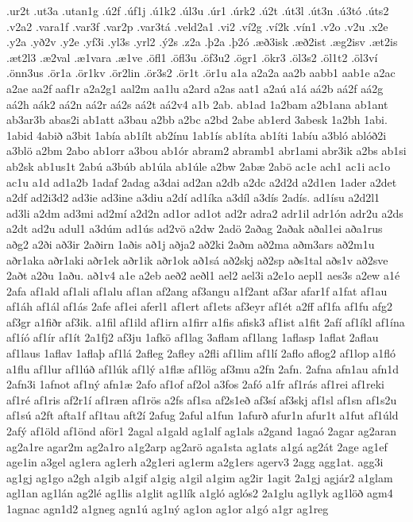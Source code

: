 {.ur2t
.ut3a
.utan1g
.ú2f
.úf1j
.ú1k2
.úl3u
.úr1
.úrk2
.ú2t
.út3l
.út3n
.ú3tó
.úts2
.v2a2
.vara1f
.var3f
.var2p
.var3tá
.veld2a1
.vi2
.ví2g
.ví2k
.vín1
.v2o
.v2u
.x2e
.y2a
.yð2v
.y2e
.yf3i
.yl3s
.yrl2
.ý2s
.z2a
.þ2a
.þ2ó
.æð3isk
.æð2ist
.æg2isv
.æt2is
.æt2l3
.æ2val
.æ1vara
.æ1ve
.öfl1
.öfl3u
.öf3u2
.ögr1
.ökr3
.öl3s2
.öl1t2
.öl3ví
.önn3us
.ör1a
.ör1kv
.ör2lin
.ör3s2
.ör1t
.ör1u
a1a
a2a2a
aa2b
aabb1
aab1e
a2ac
a2ae
aa2f
aaf1r
a2a2g1
aal2m
aa1lu
a2ard
a2as
aat1
a2aú
a1á
aá2b
aá2f
aá2g
aá2h
aák2
aá2n
aá2r
aá2s
aá2t
aá2v4
a1b
2ab.
ab1ad
1a2bam
a2b1ana
ab1ant
ab3ar3b
abas2i
ab1att
a3bau
a2bb
a2bc
a2bd
2abe
ab1erd
3abesk
1a2bh
1abi.
1abid
4abið
a3bit
1abía
ab1ílt
ab2ínu
1ab1ís
ab1íta
ab1íti
1abíu
a3bló
ablóð2i
a3blö
a2bm
2abo
ab1orr
a3bou
ab1ór
abram2
abramb1
abr1ami
abr3ik
a2bs
ab1si
ab2sk
ab1us1t
2abú
a3búb
ab1úla
ab1úle
a2bw
2abæ
2abö
ac1e
ach1
ac1i
ac1o
ac1u
a1d
ad1a2b
1adaf
2adag
a3dai
ad2an
a2db
a2dc
a2d2d
a2d1en
1ader
a2det
a2df
ad2i3d2
ad3ie
ad3ine
a3diu
a2dí
ad1íka
a3díl
a3dís
2adís.
ad1ísu
a2d2l1
ad3li
a2dm
ad3mi
ad2mí
a2d2n
ad1or
ad1ot
ad2r
adra2
adr1il
adr1ón
adr2u
a2ds
a2dt
ad2u
adul1
a3dúm
ad1ús
ad2vö
a2dw
2adö
2aðag
2aðak
aðal1ei
aða1rus
aðg2
a2ði
að3ir
2aðirn
1aðis
að1j
aðja2
að2ki
2aðm
að2ma
aðm3ars
að2m1u
aðr1aka
aðr1aki
aðr1ek
aðr1ik
aðr1ok
að1sá
að2skj
að2sp
aðs1tal
aðs1v
að2sve
2aðt
a2ðu
1aðu.
að1v4
a1e
a2eb
aeð2
aeðl1
ael2
ael3i
a2e1o
aepl1
aes3s
a2ew
a1é
2afa
af1ald
af1ali
af1alu
af1an
af2ang
af3angu
a1f2ant
af3ar
afar1f
a1fat
af1au
af1áh
af1ál
af1ás
2afe
af1ei
aferl1
af1ert
af1ets
af3eyr
af1ét
a2ff
af1fa
af1fu
afg2
af3gr
a1fiðr
af3ik.
a1fil
af1ild
af1irn
a1firr
a1fis
afisk3
af1ist
a1fit
2afí
af1íkl
af1ína
af1íó
af1ír
af1ít
2a1fj2
af3ju
1afkö
af1lag
3aflam
af1lang
1aflasp
1aflat
2aflau
af1laus
1aflav
1aflaþ
af1lá
2afleg
2afley
a2fli
af1lim
af1lí
2aflo
aflog2
af1lop
a1fló
a1flu
af1lur
af1lúð
af1lúk
af1lý
a1flæ
af1lög
af3mu
a2fn
2afn.
2afna
afn1au
afn1d
2afn3i
1afnot
af1ný
afn1æ
2afo
af1of
af2ol
a3fos
2afó
a1fr
af1rás
af1rei
af1reki
af1ré
af1ris
af2r1í
af1ræn
af1rös
a2fs
af1sa
af2s1eð
af3sí
af3skj
af1sl
af1sn
af1s2u
af1sú
a2ft
afta1f
af1tau
aft2í
2afug
2aful
a1fun
1afurð
afur1n
afur1t
a1fut
af1úld
2afý
af1öld
af1önd
aför1
2agal
a1gald
ag1alf
ag1als
a2gand
1agaó
2agar
ag2aran
ag2a1re
agar2m
ag2a1ro
a1g2arp
ag2arö
aga1sta
ag1ats
a1gá
ag2át
2age
ag1ef
age1in
a3gel
ag1era
ag1erh
a2g1eri
ag1erm
a2g1ers
agerv3
2agg
agg1at.
agg3i
ag1gj
ag1go
a2gh
a1gib
a1gif
a1gig
a1gil
a1gim
ag2ir
1agit
2a1gj
agjár2
a1glam
agl1an
ag1lán
ag2lé
ag1lis
a1glit
ag1lík
a1gló
aglós2
2a1glu
ag1lyk
ag1löð
agm4
1agnac
agn1d2
a1gneg
agn1ú
ag1ný
ag1on
ag1or
a1gó
a1gr
ag1reg
}
